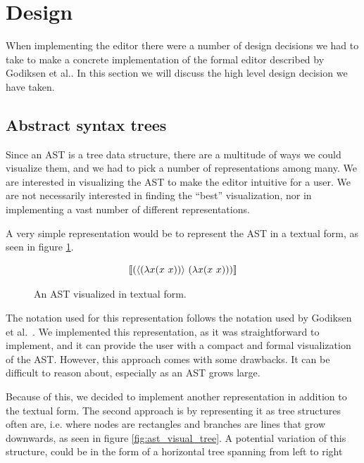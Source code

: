 \section{Design}
\label{design}

When implementing the editor there were a number of design decisions we had to
take to make a concrete implementation of the formal editor described by
Godiksen et al.\pepm. In this section we will discuss the high level design
decision we have taken.


\subsection{Abstract syntax trees}

Since an AST is a tree data structure, there are a multitude of ways we could
visualize them, and we had to pick a number of representations among many. We
are interested in visualizing the AST to make the editor intuitive for a user.
We are not necessarily interested in finding the ``best'' visualization, nor in
implementing a vast number of different representations.

A very simple representation would be to represent the AST in a textual form,
as seen in figure \ref{fig:ast-in-text-form}.

\begin{figure}[H]
    \Large
    \begin{equation*}
      \llbracket (\langle (\lambda{x}{(x~x)}) \rangle~(\lambda{x}{(x~x)})) \rrbracket
    \end{equation*}
    \caption{An AST visualized in textual form.}
    \label{fig:ast-in-text-form}
\end{figure}

The notation used for this representation follows the notation used by Godiksen
et al.~\pepm. We implemented this representation, as it was straightforward to
implement, and it can provide the user with a compact and formal visualization
of the AST. However, this approach comes with some drawbacks. It can be
difficult to reason about, especially as an AST grows large.

Because of this, we decided to implement another representation in addition to
the textual form. The second approach is by representing it as tree structures
often are, i.e. where nodes are rectangles and branches are lines that grow
downwards, as seen in figure \ref{fig:ast_visual_tree}. A potential variation
of this structure, could be in the form of a horizontal tree spanning from left
to right

